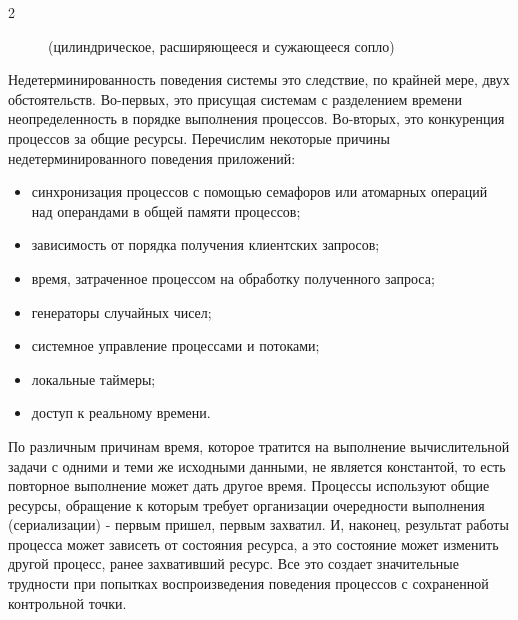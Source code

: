 \begin{multicols}{2}
\begin{figure}
{(цилиндрическое, расширяющееся и сужающееся сопло)

\label{f1bab}}

\vspace*{-3pt}

\end{figure}



Недетерминированность поведения системы это следствие, по крайней мере, двух обстоятельств. Во-первых, это присущая системам с разделением времени неопределенность в порядке выполнения процессов. Во-вторых, это конкуренция процессов за общие ресурсы. Перечислим некоторые причины недетерминированного поведения приложений:

\begin{itemize}

\item синхронизация процессов с помощью семафоров или атомарных операций над операндами в общей памяти процессов;

\item зависимость от порядка получения клиентских запросов;

\item время, затраченное процессом на обработку полученного запроса;

\item генераторы случайных чисел;

\item системное управление процессами и потоками;

\item локальные таймеры;

\item доступ к реальному времени.

\end{itemize}



По различным  причинам время, которое тратится на выполнение вычислительной задачи с одними и теми же исходными данными, не является константой, то есть повторное выполнение может дать другое время. Процессы используют общие ресурсы, обращение к которым требует организации очередности выполнения (сериализации) - первым пришел, первым захватил. И, наконец,  результат работы процесса может зависеть от состояния ресурса, а это состояние может изменить другой процесс, ранее захвативший ресурс. Все это создает значительные трудности при попытках воспроизведения поведения процессов с сохраненной контрольной точки.




\end{multicols}
